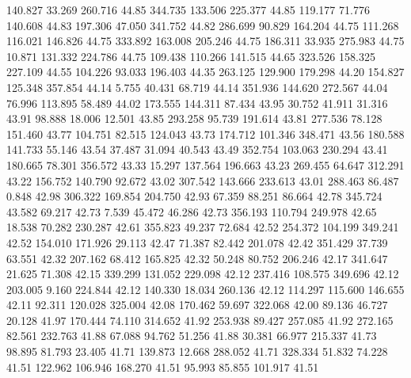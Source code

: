  140.827   33.269  260.716        44.85
 344.735  133.506  225.377        44.85
 119.177   71.776  140.608        44.83
 197.306   47.050  341.752        44.82
 286.699   90.829  164.204        44.75
 111.268  116.021  146.826        44.75
 333.892  163.008  205.246        44.75
 186.311   33.935  275.983        44.75
  10.871  131.332  224.786        44.75
 109.438  110.266  141.515        44.65
 323.526  158.325  227.109        44.55
 104.226   93.033  196.403        44.35
 263.125  129.900  179.298        44.20
 154.827  125.348  357.854        44.14
   5.755   40.431   68.719        44.14
 351.936  144.620  272.567        44.04
  76.996  113.895   58.489        44.02
 173.555  144.311   87.434        43.95
  30.752   41.911   31.316        43.91
  98.888   18.006   12.501        43.85
 293.258   95.739  191.614        43.81
 277.536   78.128  151.460        43.77
 104.751   82.515  124.043        43.73
 174.712  101.346  348.471        43.56
 180.588  141.733   55.146        43.54
  37.487   31.094   40.543        43.49
 352.754  103.063  230.294        43.41
 180.665   78.301  356.572        43.33
  15.297  137.564  196.663        43.23
 269.455   64.647  312.291        43.22
 156.752  140.790   92.672        43.02
 307.542  143.666  233.613        43.01
 288.463   86.487    0.848        42.98
 306.322  169.854  204.750        42.93
  67.359   88.251   86.664        42.78
 345.724   43.582   69.217        42.73
   7.539   45.472   46.286        42.73
 356.193  110.794  249.978        42.65
  18.538   70.282  230.287        42.61
 355.823   49.237   72.684        42.52
 254.372  104.199  349.241        42.52
 154.010  171.926   29.113        42.47
  71.387   82.442  201.078        42.42
 351.429   37.739   63.551        42.32
 207.162   68.412  165.825        42.32
  50.248   80.752  206.246        42.17
 341.647   21.625   71.308        42.15
 339.299  131.052  229.098        42.12
 237.416  108.575  349.696        42.12
 203.005    9.160  224.844        42.12
 140.330   18.034  260.136        42.12
 114.297  115.600  146.655        42.11
  92.311  120.028  325.004        42.08
 170.462   59.697  322.068        42.00
  89.136   46.727   20.128        41.97
 170.444   74.110  314.652        41.92
 253.938   89.427  257.085        41.92
 272.165   82.561  232.763        41.88
  67.088   94.762   51.256        41.88
  30.381   66.977  215.337        41.73
  98.895   81.793   23.405        41.71
 139.873   12.668  288.052        41.71
 328.334   51.832   74.228        41.51
 122.962  106.946  168.270        41.51
  95.993   85.855  101.917        41.51
